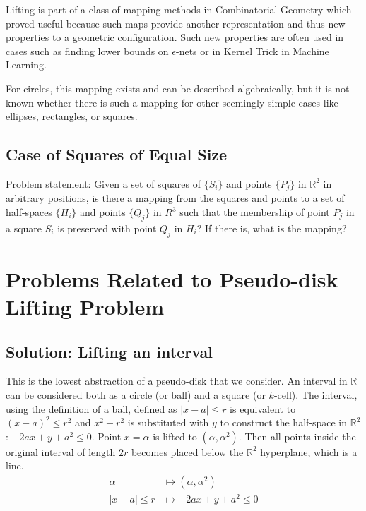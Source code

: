 \documentclass{NSF}
\begin{document}
Lifting is part of a class of mapping methods in Combinatorial Geometry which proved useful because such maps provide another representation and thus new properties to a geometric configuration. Such new properties are often used in cases such as finding lower bounds on $\epsilon$-nets or in Kernel Trick in Machine Learning. 

For circles, this mapping exists and can be described algebraically, but it is not known whether there is such a mapping for other seemingly simple cases like ellipses, rectangles, or squares. 

\subsection{Case of Squares of Equal Size}
Problem statement: Given a set of squares of  $\{S_i\}$ and points $\{P_j\}$ in $\mathbb{R}^2$ in arbitrary positions, is there a mapping from the squares and points to a set of half-spaces $\{H_i\}$ and points $\{Q_j\}$ in $R^3$ such that the membership of point $P_j$ in a square $S_i$ is preserved with point $Q_j$ in $H_i$? If there is, what is the mapping? 

\section{Problems Related to Pseudo-disk Lifting Problem}
\subsection{Solution: Lifting an interval}
This is the lowest abstraction of a pseudo-disk that we consider. An interval in $\mathbb{R}$ can be considered both as a circle (or ball) and a square (or $k$-cell). The interval, using the definition of a ball, defined as $|x-a|\leq r$ is equivalent to $(x-a)^2 \leq r^2$ and $x^2-r^2$ is substituted with $y$ to construct the half-space in $\mathbb{R}^2$: $-2ax+y+a^2 \leq 0$.  Point $x=\alpha$ is lifted to $(\alpha, \alpha^2)$. Then all points inside the original interval of length $2r$ becomes placed below the $\mathbb{R}^2$ hyperplane, which is a line.
\begin{align*}
\alpha & \mapsto (\alpha,\alpha^2) \\
|x-a|\leq r & \mapsto -2ax + y + a^2 \leq 0
\end{align*}
\end{document}
